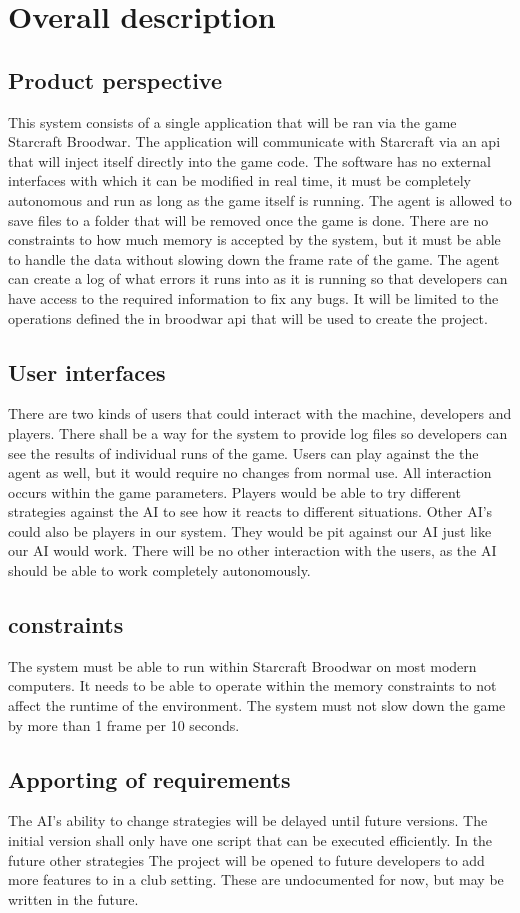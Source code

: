 \section{Overall description}

\subsection{Product perspective}
This system consists of a single application that will be ran via the game Starcraft Broodwar.
The application will communicate with Starcraft via an api that will inject itself directly into the game code.
The software has no external interfaces with which it can be modified in real time, it must be completely autonomous and run as long as the game itself is running.
The agent is allowed to save files to a folder that will be removed once the game is done. There are no constraints to how much memory is accepted by the system,
but it must be able to handle the data without slowing down the frame rate of the game.
The agent can create a log of what errors it runs into as it is running so that developers can have access to the required information to fix any bugs.
It will be limited to the operations defined the in broodwar api that will be used to create the project.

\subsection{User interfaces}
There are two kinds of users that could interact with the machine, developers and players.
There shall be a way for the system to provide log files so developers can see the results of individual runs of the game.
Users can play against the the agent as well, but it would require no changes from normal use. All interaction occurs within the game parameters.
Players would be able to try different strategies against the AI to see how it reacts to different situations.
Other AI's could also be players in our system. They would be pit against our AI just like our AI would work.
There will be no other interaction with the users, as the AI should be able to work completely autonomously.

\subsection{constraints}
The system must be able to run within Starcraft Broodwar on most modern computers. It needs to be able to operate within the memory constraints to not affect the runtime of the environment.
The system must not slow down the game by more than 1 frame per 10 seconds. 

\subsection{Apporting of requirements}
The AI's ability to change strategies will be delayed until future versions. The initial version shall only have one script that can be executed efficiently.
In the future other strategies 
The project will be opened to future developers to add more features to in a club setting. These are undocumented for now, but may be written in the future.